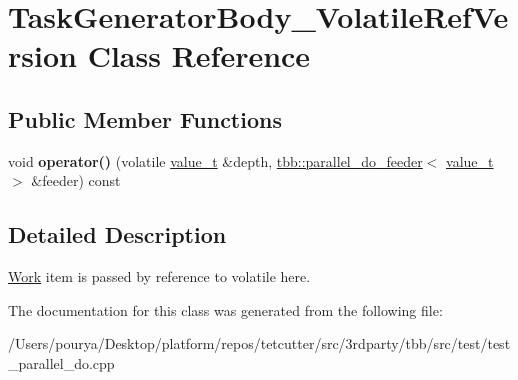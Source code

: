 \hypertarget{classTaskGeneratorBody__VolatileRefVersion}{}\section{Task\+Generator\+Body\+\_\+\+Volatile\+Ref\+Version Class Reference}
\label{classTaskGeneratorBody__VolatileRefVersion}
\subsection*{Public Member Functions}
\begin{DoxyCompactItemize}
\item 
\hypertarget{classTaskGeneratorBody__VolatileRefVersion_a758ee907c84d48416e5f38663a81da09}{}void {\bfseries operator()} (volatile \hyperlink{classvalue__t}{value\+\_\+t} \&depth, \hyperlink{classtbb_1_1parallel__do__feeder}{tbb\+::parallel\+\_\+do\+\_\+feeder}$<$ \hyperlink{classvalue__t}{value\+\_\+t} $>$ \&feeder) const \label{classTaskGeneratorBody__VolatileRefVersion_a758ee907c84d48416e5f38663a81da09}

\end{DoxyCompactItemize}


\subsection{Detailed Description}
\hyperlink{structWork}{Work} item is passed by reference to volatile here. 

The documentation for this class was generated from the following file\+:\begin{DoxyCompactItemize}
\item 
/\+Users/pourya/\+Desktop/platform/repos/tetcutter/src/3rdparty/tbb/src/test/test\+\_\+parallel\+\_\+do.\+cpp\end{DoxyCompactItemize}

